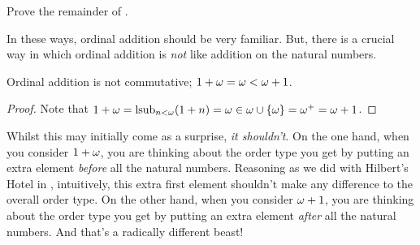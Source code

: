 \documentclass[../../../include/open-logic-section]{subfiles}
\begin{document}
\begin{prob}
Prove the remainder of
.
\end{prob}

In these ways, ordinal addition should be very familiar. But, there is a crucial way in which ordinal addition is \emph{not} like addition on the natural numbers.

\begin{prop}
Ordinal addition is {not} commutative; $1 +  \omega = \omega <
\omega +  1$.
\end{prop}

\begin{proof}
Note that $1 +  \omega = \operatorname*{\mathrm{lsub}}_{n < \omega} (1 + n)
= \omega \in \omega \cup \{\omega\} = \omega^{+} = \omega
+  1$.
\end{proof}
\noindent 
Whilst this may initially come as a surprise, \emph{it shouldn't}. On
the one hand, when you consider $1 +  \omega$, you are thinking
about the order type you get by putting an extra element \emph{before}
all the natural numbers. Reasoning as we did with Hilbert's Hotel in
, intuitively, this extra first
element shouldn't make any difference to the overall order type. On
the other hand, when you consider $\omega +  1$, you are
thinking about the order type you get by putting an extra element
\emph{after} all the natural numbers. And that's a radically different
beast!
\end{document}
